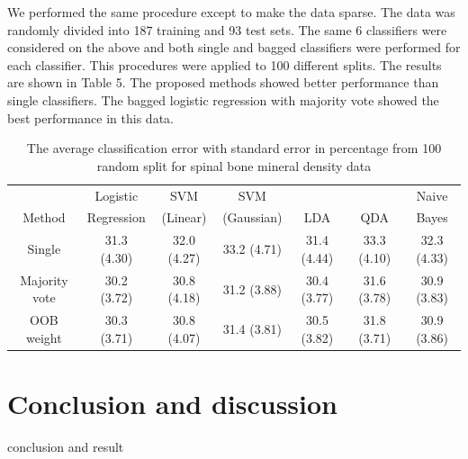 \documentclass[eng]{csam}
\begin{document}
We performed the same procedure except to make the data sparse. The data was randomly divided into 187 training and 93 test sets. The same 6 classifiers were considered on the above and both single and bagged classifiers were performed for each classifier. This procedures were applied to 100 different splits. The results are shown in Table 5. The proposed methods showed better performance than single classifiers. The bagged logistic regression with majority vote showed the best performance in this data.

\begin{table}[ht]
	\footnotesize
	\centering
	\caption{The average classification error with standard error in percentage from 100 random split for spinal bone mineral density data}
	\tabcolsep=10.5pt
	\begin{tabular}{ccccccc}
		\hline \hline
			   & Logistic   & SVM      & SVM        &     &     & Naive \\
		Method & Regression & (Linear) & (Gaussian) & LDA & QDA & Bayes \\ 
		\hline
		Single        & 31.3 (4.30) & 32.0 (4.27) & 33.2 (4.71) & 31.4 (4.44) & 33.3 (4.10) & 32.3 (4.33) \\ 
		Majority vote & 30.2 (3.72) & 30.8 (4.18) & 31.2 (3.88) & 30.4 (3.77) & 31.6 (3.78) & 30.9 (3.83) \\ 
		OOB weight    & 30.3 (3.71) & 30.8 (4.07) & 31.4 (3.81) & 30.5 (3.82) & 31.8 (3.71) & 30.9 (3.86) \\ 
		\hline \hline
	\end{tabular}
\end{table}



\section{Conclusion and discussion}
{\color{red}
	conclusion and result	
}
\end{document}
